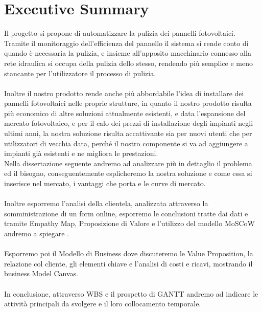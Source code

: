 \documentclass[a4paper, 12pt]{article}
\begin{document}
	\section{Executive Summary} %
	Il progetto si propone di automatizzare la pulizia dei pannelli fotovoltaici.\\
	Tramite il monitoraggio dell'efficienza del pannello il sistema si rende conto di quando è necessaria la pulizia, e insieme all'apposito macchinario connesso alla rete idraulica si occupa della pulizia dello stesso, rendendo più semplice e meno stancante per l'utilizzatore il processo di pulizia.\\\\
	Inoltre il nostro prodotto rende anche più abbordabile l'idea di installare dei pannelli fotovoltaici nelle proprie strutture, in quanto il nostro prodotto risulta più economico di altre soluzioni attualmente esistenti, e data l'espansione del mercato fotovoltaico, e per il calo dei prezzi di installazione degli impianti negli ultimi anni, la nostra soluzione risulta accattivante sia per nuovi utenti che per utilizzatori di vecchia data, perché il nostro componente si va ad aggiungere a impianti già esistenti e ne migliora le prestazioni. \\
	Nella dissertazione seguente andremo ad analizzare più in dettaglio il problema ed il bisogno, conseguentemente esplicheremo la nostra soluzione e come essa si inserisce nel mercato, i vantaggi che porta e le curve di mercato.\\
	\\
	Inoltre esporremo l'analisi della clientela, analizzata attraverso la somministrazione di un form online, %
	 esporremo le conclusioni tratte dai dati e tramite Empathy Map, Proposizione di Valore e l'utilizzo del modello MoSCoW andremo a spiegare %
	 . \\\\
	 Esporremo poi il Modello di Business dove discuteremo le Value Proposition, la relazione col cliente, gli elementi chiave e l'analisi di costi e ricavi, mostrando il business Model Canvas.
	\\\\
	In conclusione, attraverso WBS e il prospetto di GANTT andremo ad indicare le attività principali da svolgere e il loro collocamento temporale.
	
	\newpage
\end{document}

